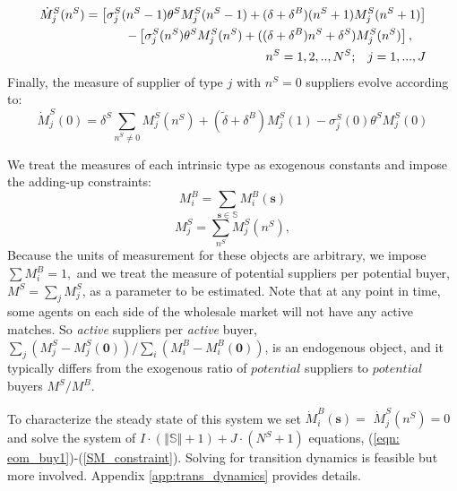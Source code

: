 \documentclass[12pt]{article} \usepackage{amsmath,amssymb,amsthm,geometry,graphicx,setspace,algorithm,algpseudocode,float}
\begin{document}
\begin{align}
\label{eqn: eom_seller1}
\dot{M}_{j}^{S}(n^S) = \left[\sigma^S_j(n^S-1)\theta^S M_j^S(n^S-1) + (\delta+\delta^B)(n^S+1) M_j^S(n^S+1)\right]\\
 - \left[\sigma^S_j(n^S)\theta^S M_j^S(n^S) + ((\delta+\delta^B)n^S+\delta^S) M_j^S(n^S)\right],\;\;\;\; \notag \\
 n^S = 1,2,..,N^S; \;\;\; j = 1,...,J \notag 
 \end{align}
Finally, the measure of supplier of type $j$ with $n^S=0$ suppliers evolve according to:
\begin{equation}
\dot{M}_{j}^{S}(0)=\delta^S\sum_{n^S\neq 0}M_j^S(n^S)+(\tilde{\delta}+\delta^B) M_{j}^{S}(1)-\sigma^S_{j}(0)\theta^{S}M_{j}^{S}(0)
\label{eqn: eom_seller2}
\end{equation}
\par
We treat the measures of each intrinsic type as
exogenous constants and impose the adding-up constraints:%
\begin{equation}
M_{i}^{B}=\sum_{\mathbf{s\in }\mathbb{S}}M_{i}^{B}(\mathbf{s})
\label{BM_constrant}
\end{equation}%
\begin{equation}
M_{j}^{S}=\sum_{n^S}M_{j}^{S}(n^S),
\label{SM_constraint}
\end{equation}
Because the units of measurement for these objects are arbitrary, we impose $\sum M_{i}^{B}=1,$ and we treat the measure of potential suppliers per potential buyer, $M^S=\sum_{j}M_{j}^{S}$, as a parameter to be estimated. 
Note that at any point in time, some agents on each side of the wholesale market will not have any active matches. So \textit{active} suppliers per \textit{active} buyer, $ \sum_{j}\left( M_{j}^{S}-M_{j}^{S}(\mathbf{0})\right)  / \sum_{i} \left( M^B_i -M_{i}^{B}(\mathbf{0}) \right) $, is an endogenous object, and it typically differs from the exogenous ratio of $potential$ suppliers to $potential$ buyers $M^S/M^B$. 
\par
To characterize the steady state of this system we set $\dot{M}_{i}^{B}(\mathbf{s})=$ $\dot{M}_{j}^{S}(n^S)=0$ and solve the system of $I\cdot (\left\Vert \mathbb{S}\right\Vert +1)+J\cdot \left( N^S+1\right) $ equations, (\ref{eqn: eom_buy1})-(\ref{SM_constraint}). Solving for transition dynamics is feasible but more involved. Appendix \ref{app:trans_dynamics} provides details. 
\par
\end{document}
